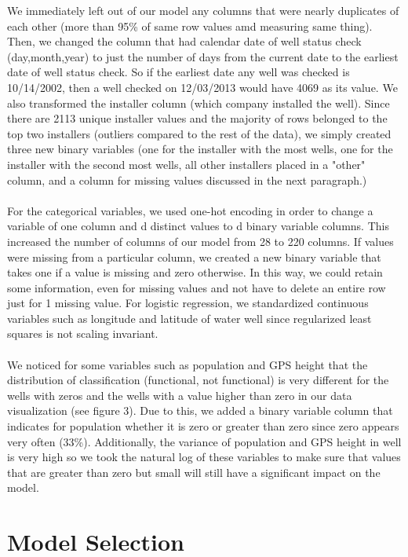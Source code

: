 \documentclass[10pt]{SelfArx} %
\begin{document}
We immediately left out of our model any columns that were nearly duplicates of each other (more than 95\% of same row values amd measuring same thing). Then, we changed the column that had calendar date of well status check (day,month,year) to just the number of days from the current date to the earliest date of well status check. So if the earliest date any well was checked is 10/14/2002, then a well checked on 12/03/2013 would have 4069 as its value. We also transformed the installer column (which company installed the well). Since there are 2113 unique installer values and the majority of rows belonged to the top two installers (outliers compared to the rest of the data), we simply created three new binary variables (one for the installer with the most wells, one for the installer with the second most wells, all other installers placed in a "other" column, and a column for missing values discussed in the next paragraph.)
\\[-1.5\baselineskip]
\\[0\baselineskip]
\break
For the categorical variables, we used one-hot encoding in order to change a variable of one column and d distinct values to d binary variable columns. This increased the number of columns of our model from 28 to 220 columns. If values were missing from a particular column, we created a new binary variable that takes one if a value is missing and zero otherwise. In this way, we could retain some information, even for missing values and not have to delete an entire row just for 1 missing value.  For logistic regression, we standardized continuous variables such as longitude and latitude of water well since regularized least squares is not scaling invariant.
\\[-1.5\baselineskip]
\\[0\baselineskip]
\break
We noticed for some variables such as population and GPS height that the distribution of classification (functional, not functional) is very different for the wells with zeros and the wells with a value higher than zero in our data visualization (see figure 3). Due to this, we added a binary variable column that indicates for population whether it is zero or greater than zero since zero appears very often (33\%). Additionally, the variance of population and GPS height in well is very high so we took the natural log of these variables to make sure that values that are greater than zero but small will still have a significant impact on the model.

\section{Model Selection}
\end{document}
